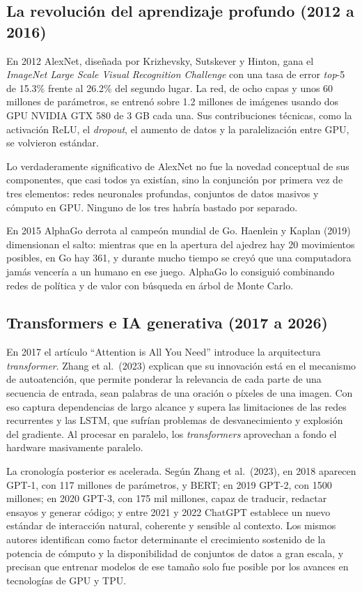 \documentclass[12pt,letterpaper,oneside]{article}
\begin{document}
\subsection{La revolución del aprendizaje profundo (2012 a 2016)}

En 2012 AlexNet, diseñada por Krizhevsky, Sutskever y Hinton, gana el \textit{ImageNet Large Scale Visual Recognition Challenge} con una tasa de error \textit{top}-5 de 15.3\% frente al 26.2\% del segundo lugar. La red, de ocho capas y unos 60 millones de parámetros, se entrenó sobre 1.2 millones de imágenes usando dos GPU NVIDIA GTX 580 de 3 GB cada una. Sus contribuciones técnicas, como la activación ReLU, el \textit{dropout}, el aumento de datos y la paralelización entre GPU, se volvieron estándar.

Lo verdaderamente significativo de AlexNet no fue la novedad conceptual de sus componentes, que casi todos ya existían, sino la conjunción por primera vez de tres elementos: redes neuronales profundas, conjuntos de datos masivos y cómputo en GPU. Ninguno de los tres habría bastado por separado.

En 2015 AlphaGo derrota al campeón mundial de Go. Haenlein y Kaplan (2019) dimensionan el salto: mientras que en la apertura del ajedrez hay 20 movimientos posibles, en Go hay 361, y durante mucho tiempo se creyó que una computadora jamás vencería a un humano en ese juego. AlphaGo lo consiguió combinando redes de política y de valor con búsqueda en árbol de Monte Carlo.

\subsection{Transformers e IA generativa (2017 a 2026)}

En 2017 el artículo ``Attention is All You Need'' introduce la arquitectura \textit{transformer}. Zhang et al.\ (2023) explican que su innovación está en el mecanismo de autoatención, que permite ponderar la relevancia de cada parte de una secuencia de entrada, sean palabras de una oración o píxeles de una imagen. Con eso captura dependencias de largo alcance y supera las limitaciones de las redes recurrentes y las LSTM, que sufrían problemas de desvanecimiento y explosión del gradiente. Al procesar en paralelo, los \textit{transformers} aprovechan a fondo el hardware masivamente paralelo.

La cronología posterior es acelerada. Según Zhang et al.\ (2023), en 2018 aparecen GPT-1, con 117 millones de parámetros, y BERT; en 2019 GPT-2, con 1500 millones; en 2020 GPT-3, con 175 mil millones, capaz de traducir, redactar ensayos y generar código; y entre 2021 y 2022 ChatGPT establece un nuevo estándar de interacción natural, coherente y sensible al contexto. Los mismos autores identifican como factor determinante el crecimiento sostenido de la potencia de cómputo y la disponibilidad de conjuntos de datos a gran escala, y precisan que entrenar modelos de ese tamaño solo fue posible por los avances en tecnologías de GPU y TPU.
\end{document}
